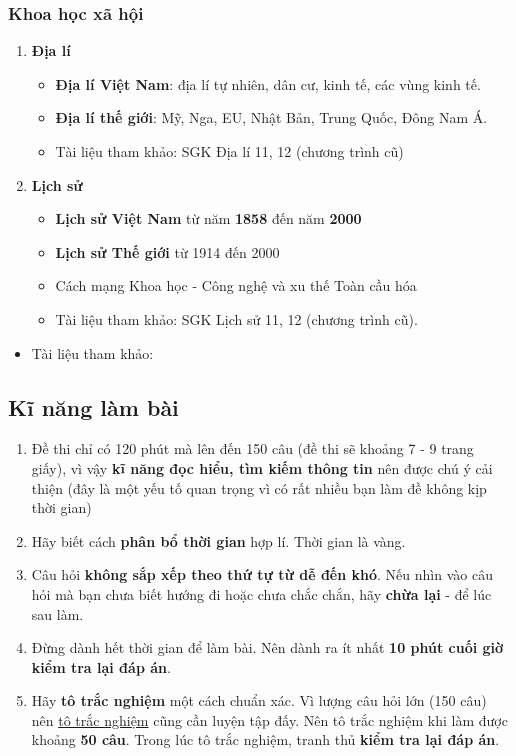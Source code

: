 \subsubsection{Khoa học xã hội}
\begin{enumerate}
    \item\textbf{Địa lí}
    \begin{itemize}
        \item \textbf{Địa lí Việt Nam}: địa lí tự nhiên, dân cư, kinh tế, các vùng kinh tế.
        \item \textbf{Địa lí thế giới}: Mỹ, Nga, EU, Nhật Bản, Trung Quốc, Đông Nam Á.
        \item Tài liệu tham khảo: SGK Địa lí 11, 12 (chương trình cũ)
    \end{itemize}
    \item\textbf{Lịch sử}
    \begin{itemize}
        \item \textbf{Lịch sử Việt Nam} từ năm \textbf{1858} đến năm \textbf{2000}
        \item \textbf{Lịch sử Thế giới} từ 1914 đến 2000
        \item Cách mạng Khoa học - Công nghệ và xu thế Toàn cầu hóa
        \item Tài liệu tham khảo: SGK Lịch sử 11, 12 (chương trình cũ). 
    \end{itemize}
\end{enumerate}
\begin{itemize}
    \item Tài liệu tham khảo: 
\end{itemize}

\subsection{Kĩ năng làm bài}
\label{sec:kinanglambai}
\begin{enumerate}
    \item Đề thi chỉ có 120 phút mà lên đến 150 câu (đề thi sẽ khoảng 7 - 9 trang giấy), vì vậy \textbf{kĩ năng đọc hiểu, tìm kiếm thông tin} nên được chú ý cải thiện (đây là một yếu tố quan trọng vì có rất nhiều bạn làm đề không kịp thời gian)
    \item Hãy biết cách \textbf{phân bổ thời gian} hợp lí. Thời gian là vàng.
    \item Câu hỏi \textbf{không sắp xếp theo thứ tự từ dễ đến khó}. Nếu nhìn vào câu hỏi mà bạn chưa biết hướng đi hoặc chưa chắc chắn, hãy \textbf{chừa lại} - để lúc sau làm.
    \item Đừng dành hết thời gian để làm bài. Nên dành ra ít nhất \textbf{10 phút cuối giờ kiểm tra lại đáp án}.
    \item Hãy \textbf{tô trắc nghiệm} một cách chuẩn xác. Vì lượng câu hỏi lớn (150 câu) nên \hyperref[sec:giaidephongthi]{tô trắc nghiệm} cũng cần luyện tập đấy. Nên tô trắc nghiệm khi làm được khoảng \textbf{50 câu}. Trong lúc tô trắc nghiệm, tranh thủ \textbf{kiểm tra lại đáp án}.
\end{enumerate}
